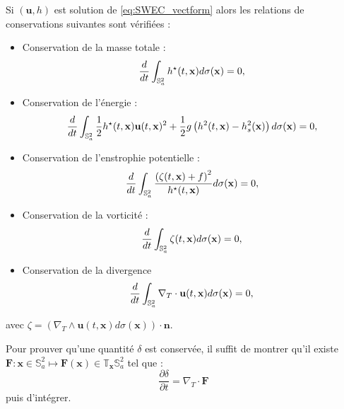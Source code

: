 \begin{proposition}
\label{prop:swe_cons}
Si $(\mathbf{u},h)$ est solution de \eqref{eq:SWEC_vectform} alors les relations de conservations suivantes sont vérifiées :
\begin{itemize}
\item Conservation de la masse totale :
\begin{equation}
\dfrac{d}{dt} \displaystyle\int_{\mathbb{S}_a^2} h^{\star}(t,\mathbf{x}) d \sigma(\mathbf{x}) = 0,
\label{eq:mass}
\end{equation}
 
\item Conservation de l'énergie :
\begin{equation}
\dfrac{d}{dt} \displaystyle\int_{\mathbb{S}_a^2} \dfrac{1}{2} h^{\star}(t,\mathbf{x}) \mathbf{u}(t,\mathbf{x})^2 + \dfrac{1}{2} g \left( h^2(t,\mathbf{x}) - h_s^2(\mathbf{x}) \right)d \sigma(\mathbf{x}) = 0,
\label{eq:energy}
\end{equation}

\item Conservation de l'enstrophie potentielle :
\begin{equation}
\dfrac{d}{dt} \displaystyle\int_{\mathbb{S}_a^2} \dfrac{\left( \zeta(t,\mathbf{x}) + f \right)^2}{h^{\star}(t,\mathbf{x})} d \sigma(\mathbf{x}) = 0,
\label{eq:enstrophie}
\end{equation}

\item Conservation de la vorticité :
\begin{equation}
\dfrac{d}{dt} \displaystyle\int_{\mathbb{S}_a^2} \zeta(t,\mathbf{x}) d \sigma(\mathbf{x}) = 0,
\label{eq:vorticity}
\end{equation}

\item Conservation de la divergence
\begin{equation}
\dfrac{d}{dt} \displaystyle\int_{\mathbb{S}_a^2} \nabla_T \cdot \mathbf{u}(t,\mathbf{x}) d \sigma(\mathbf{x}) = 0,
\label{eq:divergence}
\end{equation}
\end{itemize}

avec $\zeta = \left( \nabla_T \wedge \mathbf{u}(t,\mathbf{x}) d \sigma(\mathbf{x}) \right) \cdot \mathbf{n}$.
\end{proposition}

\begin{remarque}
Pour prouver qu'une quantité $\delta$ est conservée, il suffit de montrer qu'il existe $\mathbf{F} : \mathbf{x} \in \mathbb{S}_a^2 \mapsto \mathbf{F}(\mathbf{x}) \in \mathbb{T}_{\mathbf{x}} \mathbb{S}_a^2$ tel que :
\begin{equation}
\dfrac{\partial \delta}{\partial t} = \nabla_T \cdot \mathbf{F}
\end{equation}
puis d'intégrer.
\label{rmq:int diverg nulle}
\end{remarque}


